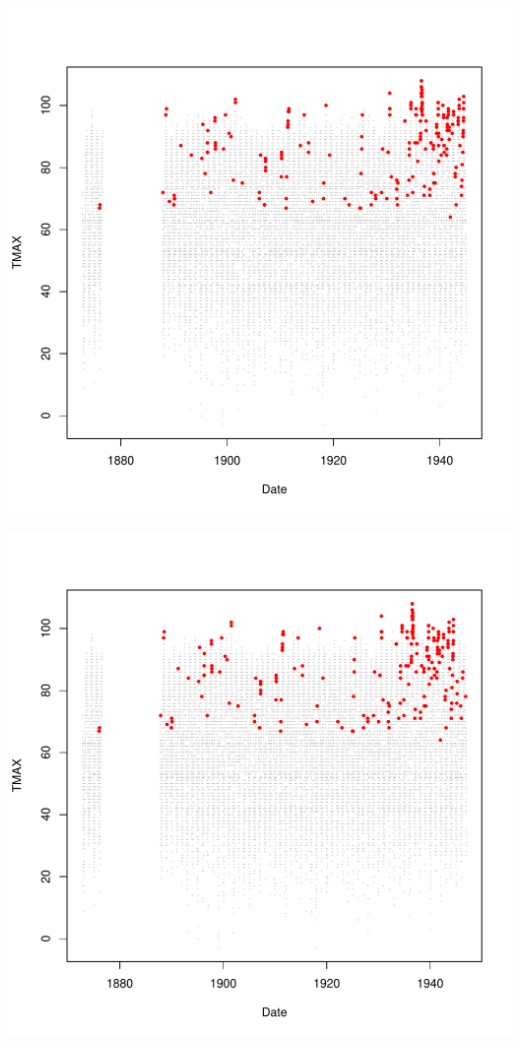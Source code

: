 \documentclass{article}\usepackage[]{graphicx}\usepackage[]{color}
\makeatletter
\def\maxwidth{ %
  \ifdim\Gin@nat@width>\linewidth
    \linewidth
  \else
    \Gin@nat@width
  \fi
}
\newenvironment{knitrout}{}{} %
\makeatother
\begin{document}
\begin{knitrout}
\includegraphics[width=\maxwidth]{figure/unnamed-chunk-4-32} 

\includegraphics[width=\maxwidth]{figure/unnamed-chunk-4-33} 


\end{knitrout}
\end{document}
